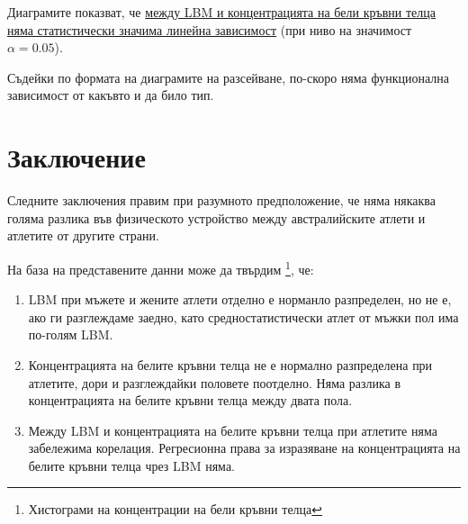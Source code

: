 \documentclass[12pt]{article} %
\begin{document}
\begin{large}
Диаграмите показват, че \uline{между LBM и концентрацията на бели кръвни телца няма статистически значима линейна зависимост} (при ниво на значимост $\alpha=0.05$). \par
Съдейки по формата на диаграмите на разсейване, по-скоро няма функционална зависимост от какъвто и да било тип.

\section{Заключение}
Следните заключения правим при  разумното предположение, че няма някаква голяма разлика във физическото устройство между австралийските атлети и атлетите от другите страни. \par
На база на представените данни може да твърдим \footnote{Хистограми на концентрации на бели кръвни телца}, че:
\begin{enumerate}
\item LBM при мъжете и жените атлети отделно е норманло разпределен, но не е, ако ги разглеждаме заедно, като средностатистически атлет от мъжки пол има по-голям LBM.
\item Концентрацията на белите кръвни телца не е нормално разпределена при атлетите, дори и разглеждайки половете поотделно. Няма разлика в концентрацията на белите кръвни телца между двата пола.
\item Между LBM и концентрацията на белите кръвни телца при атлетите няма забележима корелация. Регресионна права за изразяване на концентрацията на белите кръвни телца чрез LBM няма.
\end{enumerate}

\listoffigures

\listoftables
\end{large}
\end{document}
